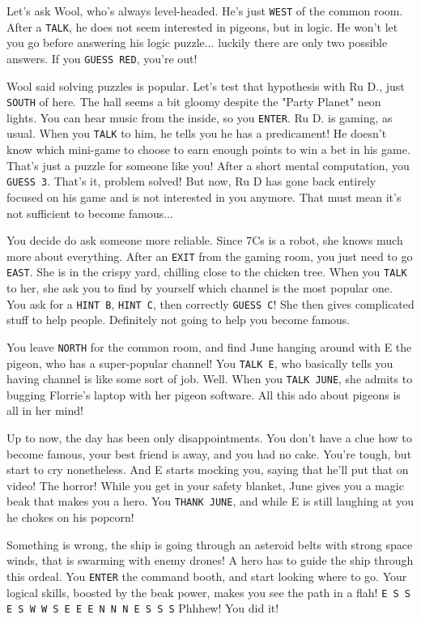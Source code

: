\documentclass{article}
\newcommand{\bckg}[1]{\AddToShipoutPictureBG*{\texttt{[image: \#1]}}}
\begin{document}
Let's ask Wool, who's always level-headed. He's just \texttt{WEST} of the common room.
After a \texttt{TALK}, he does not seem interested in pigeons, but in logic.
He won't let you go before answering his logic puzzle... luckily there are only two possible answers.
If you \texttt{GUESS RED}, you're out!

Wool said solving puzzles is popular.
Let's test that hypothesis with Ru D., just \texttt{SOUTH} of here.
The hall seems a bit gloomy despite the "Party Planet" neon lights.
You can hear music from the inside, so you \texttt{ENTER}.
Ru D. is gaming, as usual. When you \texttt{TALK} to him, he tells you he has a predicament!
He doesn't know which mini-game to choose to earn enough points to win a bet in his game.
That's just a puzzle for someone like you!
After a short mental computation, you \texttt{GUESS 3}. That's it, problem solved!
But now, Ru D has gone back entirely focused on his game and is not interested in you anymore.
That must mean it's not sufficient to become famous...

\clearpage
\bckg{img/bg}

You decide do ask someone more reliable.
Since 7Cs is a robot, she knows much more about everything.
After an \texttt{EXIT} from the gaming room, you just need to go \texttt{EAST}.
She is in the crispy yard, chilling close to the chicken tree.
When you \texttt{TALK} to her, she ask you to find by yourself which channel is the most popular one.
You ask for a \texttt{HINT B}, \texttt{HINT C}, then correctly \texttt{GUESS C}!
She then gives complicated stuff to help people.
Definitely not going to help you become famous.

You leave \texttt{NORTH} for the common room,
and find June hanging around with E the pigeon, who has a super-popular channel!
You \texttt{TALK E}, who basically tells you having channel is like some sort of job.
Well. When you \texttt{TALK JUNE}, she admits to bugging Florrie's laptop with her pigeon software.
All this ado about pigeons is all in her mind!

Up to now, the day has been only disappointments.
You don't have a clue how to become famous, your best friend is away, and you had no cake.
You're tough, but start to cry nonetheless.
And E starts mocking you, saying that he'll put that on video! The horror!
While you get in your safety blanket, June gives you a magic beak that makes you a hero.
You \texttt{THANK JUNE}, and while E is still laughing at you he chokes on his popcorn!

Something is wrong, the ship is going through an asteroid belts with strong space winds,
that is swarming with enemy drones! A hero has to guide the ship through this ordeal.
You \texttt{ENTER} the command booth, and start looking where to go.
Your logical skills, boosted by the beak power, makes you see the path in a flah!
\texttt{E S S E S W W S E E E N N N E S S S}
Phhhew! You did it!
\end{document}
